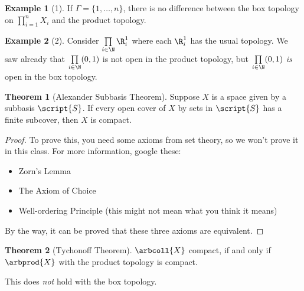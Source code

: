 \documentclass[a5paper]{article}
\theoremstyle{definition}%
\newtheorem{theorem}{Theorem}
\newtheorem*{example*}{Example}
\numberwithin{exercise}{section}
\theoremstyle{remark}%
\begin{document}
\begin{example*}[1]
If $\Gamma=\{1,\ldots, n\}$, there is no difference between the box topology on $\prod\limits_{i=1}^n X_i $ and the product topology. 
\end{example*}

\begin{example*}[2]
Consider $\prod\limits_{i\in\N}\R^1_i$ where each $\R^1_i$ has the usual topology. We saw already that $\prod\limits_{i\in\N}(0,1)$ is not open in the product topology, but $\prod\limits_{i\in\N}(0,1)$ \emph{is} open in the box topology. 
\end{example*}

\begin{highlight}
\begin{theorem}[Alexander Subbasis Theorem]
Suppose $X$ is a space given by a subbasis $\script{S}$. If every open cover of $X$ by sets in $\script{S}$ has a finite subcover, then $X$ is compact. 
\end{theorem}
\end{highlight}
\begin{proof}
To prove this, you need some axioms from set theory, so we won't prove it in this class. For more information, google these:
\begin{itemize}
\item Zorn's Lemma
\item The Axiom of Choice
\item Well-ordering Principle (this might not mean what you think it means)
\end{itemize}
By the way, it can be proved that these three axioms are equivalent. 
\end{proof}
\begin{highlight}
\begin{theorem}[Tychonoff Theorem]
$\arbcoll{X}$ compact, if and only if $\arbprod{X}$ with the product topology is compact. 

This does \emph{not} hold with the box topology. 
\end{theorem}
\end{highlight}
\end{document}
